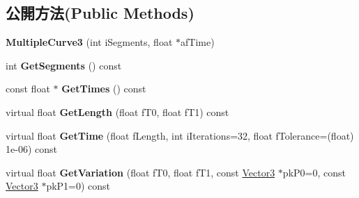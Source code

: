 \subsection*{公開方法(Public Methods)}
\begin{DoxyCompactItemize}
\item 
{\bfseries Multiple\+Curve3} (int i\+Segments, float $\ast$af\+Time)\hypertarget{class_i_dream_sky_1_1_multiple_curve3_ae368052ec9617ebe1c393f3dd851c7f9}{}\label{class_i_dream_sky_1_1_multiple_curve3_ae368052ec9617ebe1c393f3dd851c7f9}

\item 
int {\bfseries Get\+Segments} () const \hypertarget{class_i_dream_sky_1_1_multiple_curve3_a2e1ba08b767751443d5259f130bc301b}{}\label{class_i_dream_sky_1_1_multiple_curve3_a2e1ba08b767751443d5259f130bc301b}

\item 
const float $\ast$ {\bfseries Get\+Times} () const \hypertarget{class_i_dream_sky_1_1_multiple_curve3_a6991dab41cfa5ab9dfd6dffc88b7e09f}{}\label{class_i_dream_sky_1_1_multiple_curve3_a6991dab41cfa5ab9dfd6dffc88b7e09f}

\item 
virtual float {\bfseries Get\+Length} (float f\+T0, float f\+T1) const \hypertarget{class_i_dream_sky_1_1_multiple_curve3_ad166decd28292c753342e1a5fecc3722}{}\label{class_i_dream_sky_1_1_multiple_curve3_ad166decd28292c753342e1a5fecc3722}

\item 
virtual float {\bfseries Get\+Time} (float f\+Length, int i\+Iterations=32, float f\+Tolerance=(float) 1e-\/06) const \hypertarget{class_i_dream_sky_1_1_multiple_curve3_a91c2058a33fdd20a2cc38dc8206fa420}{}\label{class_i_dream_sky_1_1_multiple_curve3_a91c2058a33fdd20a2cc38dc8206fa420}

\item 
virtual float {\bfseries Get\+Variation} (float f\+T0, float f\+T1, const \hyperlink{class_i_dream_sky_1_1_vector3}{Vector3} $\ast$pk\+P0=0, const \hyperlink{class_i_dream_sky_1_1_vector3}{Vector3} $\ast$pk\+P1=0) const \hypertarget{class_i_dream_sky_1_1_multiple_curve3_aa7c0b6c58842cf5715d54865f2bd6114}{}\label{class_i_dream_sky_1_1_multiple_curve3_aa7c0b6c58842cf5715d54865f2bd6114}

\end{DoxyCompactItemize}
